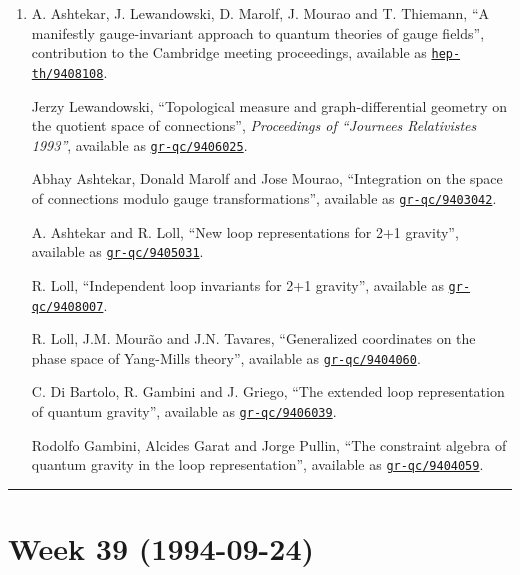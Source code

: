 \documentclass{article}
\begin{document}
\begin{enumerate}
\def\labelenumi{\arabic{enumi})}
\setcounter{enumi}{6}
\item
  A. Ashtekar, J. Lewandowski, D. Marolf, J. Mourao and T. Thiemann, ``A
  manifestly gauge-invariant approach to quantum theories of gauge
  fields'', contribution to the Cambridge meeting proceedings, available
  as
  \href{http://xxx.lanl.gov/abs/hep-th/9408108}{\texttt{hep-th/9408108}}.

  Jerzy Lewandowski, ``Topological measure and graph-differential
  geometry on the quotient space of connections'', \emph{Proceedings of
  ``Journees Relativistes 1993''}, available as
  \href{http://xxx.lanl.gov/abs/gr-qc/9406025}{\texttt{gr-qc/9406025}}.

  Abhay Ashtekar, Donald Marolf and Jose Mourao, ``Integration on the
  space of connections modulo gauge transformations'', available as
  \href{http://xxx.lanl.gov/abs/gr-qc/9403042}{\texttt{gr-qc/9403042}}.

  A. Ashtekar and R. Loll, ``New loop representations for 2+1 gravity'',
  available as
  \href{http://xxx.lanl.gov/abs/gr-qc/9405031}{\texttt{gr-qc/9405031}}.

  R. Loll, ``Independent loop invariants for 2+1 gravity'', available as
  \href{http://xxx.lanl.gov/abs/gr-qc/9408007}{\texttt{gr-qc/9408007}}.

  R. Loll, J.M. Mourão and J.N. Tavares, ``Generalized coordinates on
  the phase space of Yang-Mills theory'', available as
  \href{http://xxx.lanl.gov/abs/gr-qc/9404060}{\texttt{gr-qc/9404060}}.

  C. Di Bartolo, R. Gambini and J. Griego, ``The extended loop
  representation of quantum gravity'', available as
  \href{http://xxx.lanl.gov/abs/gr-qc/9406039}{\texttt{gr-qc/9406039}}.

  Rodolfo Gambini, Alcides Garat and Jorge Pullin, ``The constraint
  algebra of quantum gravity in the loop representation'', available as
  \href{http://xxx.lanl.gov/abs/gr-qc/9404059}{\texttt{gr-qc/9404059}}.
\end{enumerate}

\begin{center}\rule{0.5\linewidth}{0.5pt}\end{center}
\hypertarget{week-39-1994-09-24}{%
\section{Week 39 (1994-09-24)}\label{week-39-1994-09-24}}
\end{document}
